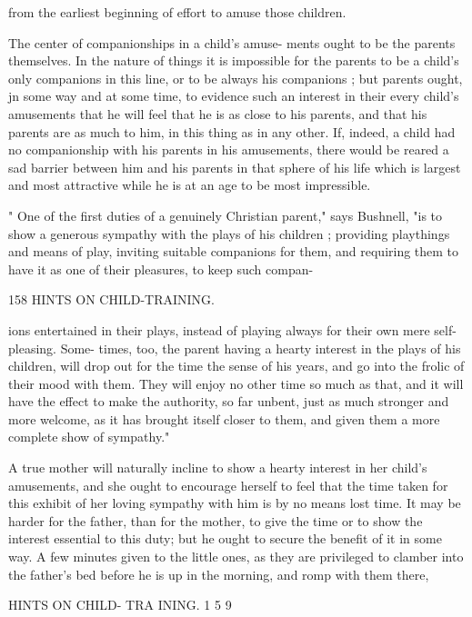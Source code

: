 \documentclass[
]{book}
\begin{document}
from the earliest beginning of effort to amuse those children.

The center of companionships in a child's amuse- ments ought to be the parents themselves. In the nature of things it is impossible for the parents to be a child's only companions in this line, or to be always his companions ; but parents ought, jn some way and at some time, to evidence such an interest in their every child's amusements that he will feel that he is as close to his parents, and that his parents are as much to him, in this thing as in any other. If, indeed, a child had no companionship with his parents in his amusements, there would be reared a sad barrier between him and his parents in that sphere of his life which is largest and most attractive while he is at an age to be most impressible.

" One of the first duties of a genuinely Christian parent," says Bushnell, "is to show a generous sympathy with the plays of his children ; providing playthings and means of play, inviting suitable companions for them, and requiring them to have it as one of their pleasures, to keep such compan-

158 HINTS ON CHILD-TRAINING.

ions entertained in their plays, instead of playing always for their own mere self-pleasing. Some- times, too, the parent having a hearty interest in the plays of his children, will drop out for the time the sense of his years, and go into the frolic of their mood with them. They will enjoy no other time so much as that, and it will have the effect to make the authority, so far unbent, just as much stronger and more welcome, as it has brought itself closer to them, and given them a more complete show of sympathy."

A true mother will naturally incline to show a hearty interest in her child's amusements, and she ought to encourage herself to feel that the time taken for this exhibit of her loving sympathy with him is by no means lost time. It may be harder for the father, than for the mother, to give the time or to show the interest essential to this duty; but he ought to secure the benefit of it in some way. A few minutes given to the little ones, as they are privileged to clamber into the father's bed before he is up in the morning, and romp with them there,

HINTS ON CHILD- TRA INING. 1 5 9
\end{document}
